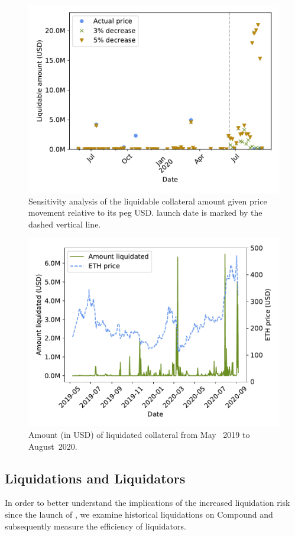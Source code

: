 \begin{figure}[tb]
  \centering
  \includegraphics[width=.7\textwidth]{./5b-economic-security/figures/dai-sensitivity.pdf}
  \caption{Sensitivity analysis of the liquidable collateral amount given  price movement relative to its peg USD.  launch date is marked by the dashed vertical line.}
  \label{fig:price-sensitivity}
\end{figure}

\begin{figure}[tb]
  \centering
  \includegraphics[width=.7\textwidth]{./5b-economic-security/figures/liquidation-over-time.pdf}
  \caption{Amount (in USD) of liquidated collateral from May ~2019 to August~2020.}
  \label{fig:liquidations-over-time}
\end{figure}

\subsection{Liquidations and Liquidators}
In order to better understand the implications of the increased liquidation risk since the launch of , we examine historical liquidations on Compound and subsequently measure the efficiency of liquidators.

